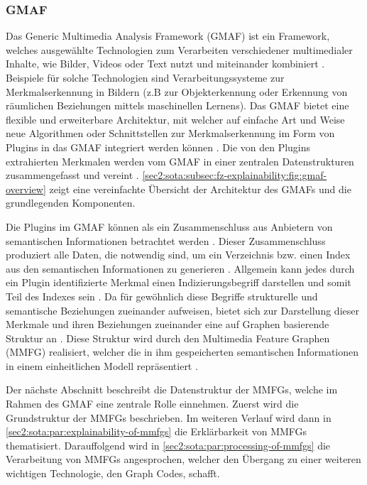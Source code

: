 \subsubsection{GMAF}
\label{sec2:sota:subsubsec:gmaf}
Das Generic Multimedia Analysis Framework (GMAF) \cite{gmaf_github} ist ein Framework, welches ausgewählte Technologien zum Verarbeiten verschiedener multimedialer Inhalte, wie Bilder, Videos oder Text nutzt und miteinander kombiniert \cite{ai-based-sem-ind-retr-soc, exp-mmfg}.
Beispiele für solche Technologien sind Verarbeitungssysteme zur Merkmalserkennung in Bildern (z.B zur Objekterkennung oder Erkennung von räumlichen Beziehungen mittels maschinellen Lernens).
Das GMAF bietet eine flexible und erweiterbare Architektur, mit welcher auf einfache Art und Weise neue Algorithmen oder Schnittstellen zur Merkmalserkennung im Form von Plugins in das GMAF integriert werden können \cite{exp-mmfg}.
Die von den Plugins extrahierten Merkmalen werden vom GMAF in einer zentralen Datenstrukturen zusammengefasst und vereint \cite{ai-based-sem-ind-retr-soc, jour-smmir}. \cref{sec2:sota:subsec:fz-explainability:fig:gmaf-overview} zeigt eine vereinfachte Übersicht der Architektur des GMAFs und die grundlegenden Komponenten. 

Die Plugins im GMAF können als ein Zusammenschluss aus Anbietern von semantischen Informationen betrachtet werden \cite{ai-based-sem-ind-retr-soc}.
Dieser Zusammenschluss produziert alle Daten, die notwendig sind, um ein Verzeichnis bzw. einen Index aus den semantischen Informationen zu generieren \cite{ai-based-sem-ind-retr-soc}.
Allgemein kann jedes durch ein Plugin identifizierte Merkmal einen Indizierungsbegriff darstellen und somit Teil des Indexes sein \cite{fast-effec-retr-large-collec}.
Da für gewöhnlich diese Begriffe strukturelle und semantische Beziehungen zueinander aufweisen, bietet sich zur Darstellung dieser Merkmale und ihren Beziehungen zueinander eine auf Graphen basierende Struktur an \cite{fast-effec-retr-large-collec}.
Diese Struktur wird durch den Multimedia Feature Graphen (MMFG) realisiert, welcher die in ihm gespeicherten semantischen Informationen in einem einheitlichen Modell repräsentiert \cite{fast-effec-retr-large-collec}.

Der nächste Abschnitt beschreibt die Datenstruktur der MMFGs, welche im Rahmen des GMAF eine zentrale Rolle einnehmen.
Zuerst wird die Grundstruktur der MMFGs beschrieben.
Im weiteren Verlauf wird dann in \cref{sec2:sota:par:explainability-of-mmfgs} die Erklärbarkeit von MMFGs thematisiert.
Darauffolgend wird in \cref{sec2:sota:par:processing-of-mmfgs} die Verarbeitung von MMFGs angesprochen, welcher den Übergang zu einer weiteren wichtigen Technologie, den Graph Codes, schafft.

